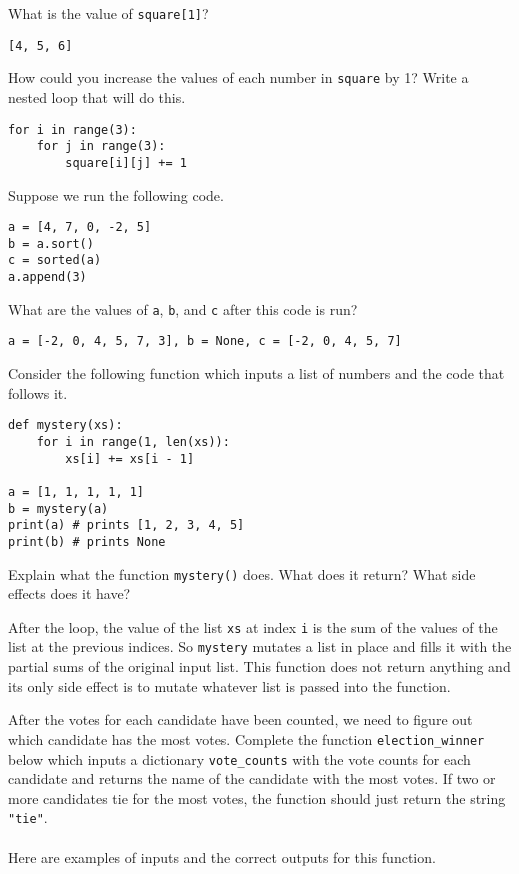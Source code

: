 \documentclass[12pt]{exam}
\begin{document}
\begin{questions}
\begin{parts}
\item What is the value of \verb|square[1]|? 
\begin{solution}
\verb|[4, 5, 6]|
\end{solution}
\bigskip
\bigskip

\item How could you increase the values of each number in \verb|square| by 1? Write a nested loop that will do this.   
\begin{solution}
\begin{verbatim}
for i in range(3):
    for j in range(3):
        square[i][j] += 1
\end{verbatim}
\end{solution}
\vfill
\vfill
\end{parts}


\question Suppose we run the following code. 

\begin{verbatim}
a = [4, 7, 0, -2, 5]
b = a.sort()
c = sorted(a)
a.append(3)
\end{verbatim}

What are the values of \verb|a|, \verb|b|, and \verb|c| after this code is run? 
\begin{solution}
\verb|a = [-2, 0, 4, 5, 7, 3], b = None, c = [-2, 0, 4, 5, 7]|
\end{solution}
\vfill

\question Consider the following function which inputs a list of numbers and the code that follows it.
\begin{verbatim}
def mystery(xs): 
    for i in range(1, len(xs)):
        xs[i] += xs[i - 1]

a = [1, 1, 1, 1, 1]
b = mystery(a)
print(a) # prints [1, 2, 3, 4, 5]
print(b) # prints None
\end{verbatim}

Explain what the function \verb|mystery()| does.  What does it return?  What side effects does it have?  
\begin{solution}
After the loop, the value of the list \verb|xs| at index \verb|i| is the sum of the values of the list at the previous indices.  So \verb|mystery| mutates a list in place and fills it with the partial sums of the original input list.  This function does not return anything and its only side effect is to mutate whatever list is passed into the function.  
\end{solution}
\vfill
\vfill

\newpage
\question After the votes for each candidate have been counted, we need to figure out which candidate has the most votes. Complete the function \verb|election_winner| below which inputs a dictionary \verb|vote_counts| with the vote counts for each candidate and returns the name of the candidate with the most votes.  If two or more candidates tie for the most votes, the function should just return the string \verb|"tie"|. \\ \\
Here are examples of inputs and the correct outputs for this function.


\end{questions}
\end{document}

